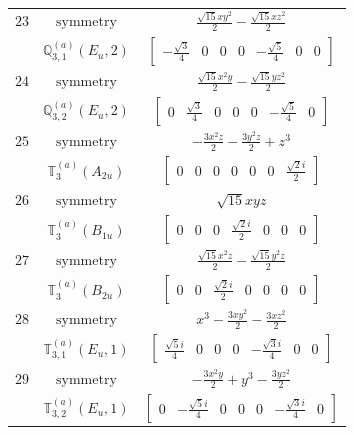 \documentclass[fleqn,8pt,landscape]{jsarticle}
\begin{document}
\begin{longtable}{ccc}
$ 23 $ & $ \text{symmetry} $ & $ \frac{\sqrt{15} x y^{2}}{2} - \frac{\sqrt{15} x z^{2}}{2} $ \\
$  $ & $ \mathbb{Q}_{3,1}^{(a)}(E_{u},2) $ & $ \begin{bmatrix} - \frac{\sqrt{3}}{4} & 0 & 0 & 0 & - \frac{\sqrt{5}}{4} & 0 & 0 \end{bmatrix} $ \\ \hline
$ 24 $ & $ \text{symmetry} $ & $ \frac{\sqrt{15} x^{2} y}{2} - \frac{\sqrt{15} y z^{2}}{2} $ \\
$  $ & $ \mathbb{Q}_{3,2}^{(a)}(E_{u},2) $ & $ \begin{bmatrix} 0 & \frac{\sqrt{3}}{4} & 0 & 0 & 0 & - \frac{\sqrt{5}}{4} & 0 \end{bmatrix} $ \\ \hline
$ 25 $ & $ \text{symmetry} $ & $ - \frac{3 x^{2} z}{2} - \frac{3 y^{2} z}{2} + z^{3} $ \\
$  $ & $ \mathbb{T}_{3}^{(a)}(A_{2u}) $ & $ \begin{bmatrix} 0 & 0 & 0 & 0 & 0 & 0 & \frac{\sqrt{2} i}{2} \end{bmatrix} $ \\ \hline
$ 26 $ & $ \text{symmetry} $ & $ \sqrt{15} x y z $ \\
$  $ & $ \mathbb{T}_{3}^{(a)}(B_{1u}) $ & $ \begin{bmatrix} 0 & 0 & 0 & \frac{\sqrt{2} i}{2} & 0 & 0 & 0 \end{bmatrix} $ \\ \hline
$ 27 $ & $ \text{symmetry} $ & $ \frac{\sqrt{15} x^{2} z}{2} - \frac{\sqrt{15} y^{2} z}{2} $ \\
$  $ & $ \mathbb{T}_{3}^{(a)}(B_{2u}) $ & $ \begin{bmatrix} 0 & 0 & \frac{\sqrt{2} i}{2} & 0 & 0 & 0 & 0 \end{bmatrix} $ \\ \hline
$ 28 $ & $ \text{symmetry} $ & $ x^{3} - \frac{3 x y^{2}}{2} - \frac{3 x z^{2}}{2} $ \\
$  $ & $ \mathbb{T}_{3,1}^{(a)}(E_{u},1) $ & $ \begin{bmatrix} \frac{\sqrt{5} i}{4} & 0 & 0 & 0 & - \frac{\sqrt{3} i}{4} & 0 & 0 \end{bmatrix} $ \\ \hline
$ 29 $ & $ \text{symmetry} $ & $ - \frac{3 x^{2} y}{2} + y^{3} - \frac{3 y z^{2}}{2} $ \\
$  $ & $ \mathbb{T}_{3,2}^{(a)}(E_{u},1) $ & $ \begin{bmatrix} 0 & - \frac{\sqrt{5} i}{4} & 0 & 0 & 0 & - \frac{\sqrt{3} i}{4} & 0 \end{bmatrix} $ \\ \hline

\end{longtable}
\end{document}
